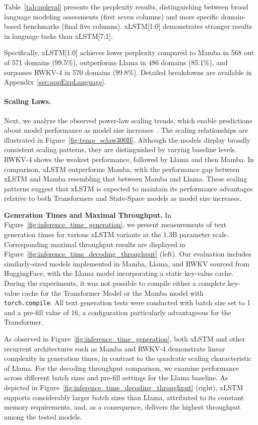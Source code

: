 Table~\ref{tab:ppleval} presents the perplexity results, distinguishing between broad language modeling assessments (first seven columns) and more specific domain-based benchmarks (final five columns). xLSTM[1:0] demonstrates stronger results in language tasks than xLSTM[7:1].

Specifically, xLSTM[1:0] achieves lower perplexity compared to Mamba in 568 out of 571 domains (99.5\%), outperforms Llama in 486 domains (85.1\%), and surpasses RWKV-4 in 570 domains (99.8\%). Detailed breakdowns are available in Appendix~\ref{sec:appExpLanguage}.

\paragraph{Scaling Laws.} Next, we analyze the observed power-law scaling trends, which enable predictions about model performance as model size increases~\citep{Kaplan:20,Brown:20short}.
The scaling relationships are illustrated in Figure~\ref{fig:temp_sclaw300B}. Although the models display broadly consistent scaling patterns, they are distinguished by varying baseline levels. RWKV-4 shows the weakest performance, followed by Llama and then Mamba. In comparison, xLSTM outperforms Mamba, with the performance gap between xLSTM and Mamba resembling that between Mamba and Llama. These scaling patterns suggest that xLSTM is expected to maintain its performance advantages relative to both Transformers and State-Space models as model size increases.

\textbf{Generation Times and Maximal Throughput.} In Figure~\ref{fig:inference_time_generation}, we present measurements of text generation times for various xLSTM variants at the 1.3B parameter scale. Corresponding maximal throughput results are displayed in Figure~\ref{fig:inference_time_decoding_throughput} (left). Our evaluation includes similarly-sized models implemented in Mamba, Llama, and RWKV sourced from HuggingFace, with the Llama model incorporating a static key-value cache. During the experiments, it was not possible to compile either a complete key-value cache for the Transformer Model or the Mamba model with \texttt{torch.compile}. All text generation tests were conducted with batch size set to 1 and a pre-fill value of 16, a configuration particularly advantageous for the Transformer. 

As observed in Figure~\ref{fig:inference_time_generation}, both xLSTM and other recurrent architectures such as Mamba and RWKV-4 demonstrate linear complexity in generation times, in contrast to the quadratic scaling characteristic of Llama. For the decoding throughput comparison, we examine performance across different batch sizes and pre-fill settings for the Llama baseline. As depicted in Figure~\ref{fig:inference_time_decoding_throughput} (right), xLSTM supports considerably larger batch sizes than Llama, attributed to its constant memory requirements, and, as a consequence, delivers the highest throughput among the tested models.

